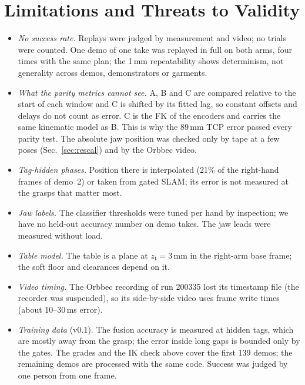 \documentclass[conference,10pt]{IEEEtran}
\newcommand{\mm}{\,mm\xspace}
\begin{document}
\section{Limitations and Threats to Validity}\label{sec:limits}
\begin{itemize}
\item \emph{No success rate.} Replays were judged by measurement and video; no trials were counted. One demo of one take
  was replayed in full on both arms, four times with the same plan; the 1\mm repeatability shows determinism, not
  generality across demos, demonstrators or garments.
\item \emph{What the parity metrics cannot see.} A, B and C are compared relative to the start of each window and C is
  shifted by its fitted lag, so constant offsets and delays do not count as error. C is the FK of the encoders and carries
  the same kinematic model as B. This is why the 89\mm TCP error passed every parity test. The absolute jaw position was
  checked only by tape at a few poses (Sec.~\ref{sec:rescal}) and by the Orbbec video.
\item \emph{Tag-hidden phases.} Position there is interpolated (21\% of the right-hand frames of demo~2) or taken from
  gated SLAM; its error is not measured at the grasps that matter most.
\item \emph{Jaw labels.} The classifier thresholds were tuned per hand by inspection; we have no held-out accuracy number
  on demo takes. The jaw leads were measured without load.
\item \emph{Table model.} The table is a plane at $z_\mathrm{t}=3$\mm in the right-arm base frame; the soft floor and
  clearances depend on it.
\item \emph{Video timing.} The Orbbec recording of run 200335 lost its timestamp file (the recorder was suspended), so its
  side-by-side video uses frame write times (about 10--30\,ms error).
\item \emph{Training data} (v0.1). The fusion accuracy is measured at hidden tags, which are mostly away from the grasp;
  the error inside long gaps is bounded only by the gates. The grades and the IK check above cover the first 139 demos; the
  remaining demos are processed with the same code. Success was judged by one person from one frame.
\end{itemize}

\end{document}
